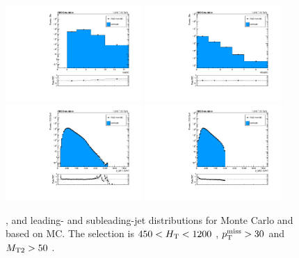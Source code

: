 \begin{figure}[htbp]
  \begin{center}
    \includegraphics[width=0.46\textwidth]{figs/qcd/rs_mc/lowht_nJet30.pdf}
    \includegraphics[width=0.46\textwidth]{figs/qcd/rs_mc/lowht_nBJet20.pdf} \\
    \includegraphics[width=0.46\textwidth]{figs/qcd/rs_mc/lowht_J0pt.pdf}
    \includegraphics[width=0.46\textwidth]{figs/qcd/rs_mc/lowht_J1pt.pdf}
    \caption{\njets, \nbtags and leading- and subleading-jet \pt distributions for Monte Carlo and \rs based on MC. The selection is $450 < H_{\mathrm{T}} < 1200$ \GeV, $p_{\mathrm{T}}^{\mathrm{miss}} > 30$ \GeV and $M_{\mathrm{T2}} > 50$ \GeV.
            }
    \label{Fig:rs_mc_jets_lowht}
  \end{center}
\end{figure}

